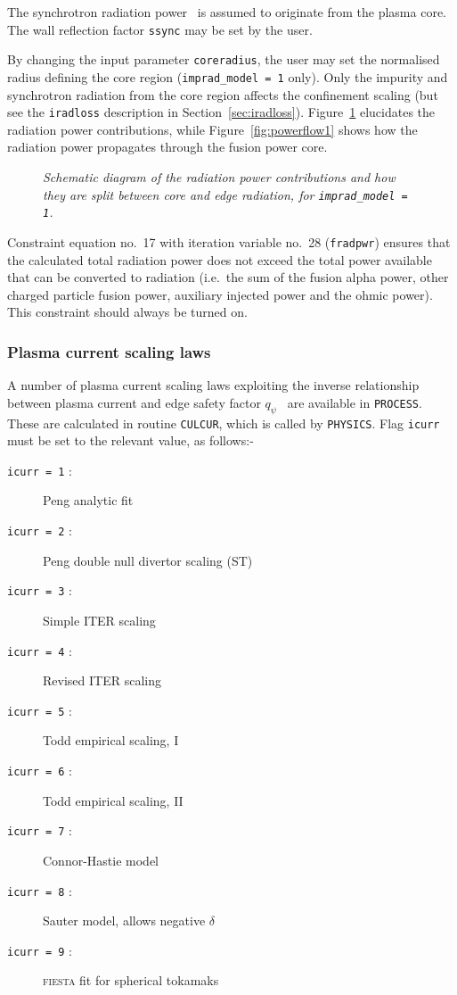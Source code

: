 \documentclass[11pt,a4paper]{report}
\newcommand{\process}{\mbox{\texttt{PROCESS}}}
\begin{document}
The synchrotron radiation power~\cite{albajar, fidone} is assumed to originate
from the plasma core. The wall reflection factor \texttt{ssync} may be set by
the user.

By changing the input parameter \texttt{coreradius}, the user may set the
normalised radius defining the core region (\texttt{imprad\_model = 1}
only). Only the impurity and synchrotron radiation from the core region
affects the confinement scaling (but see the \texttt{iradloss} description in
Section~\ref{sec:iradloss}). Figure~\ref{fig:radiation} elucidates the
radiation power contributions, while Figure~\ref{fig:powerflow1} shows how the radiation power propagates through the fusion power core.

\begin{figure}[tbph]
\caption[Radiation power contributions] {\label{fig:radiation}
  \textit{Schematic diagram of the radiation power contributions and how they
    are split between core and edge radiation, for \texttt{imprad\_model = 1}.} }
\end{figure}

Constraint equation no.~17 with iteration variable no.~28 (\texttt{fradpwr})
ensures that the calculated total radiation power does not exceed the total
power available that can be converted to radiation (i.e.\ the sum of the fusion
alpha power, other charged particle fusion power, auxiliary injected power and
the ohmic power). This constraint should always be turned on.

\subsubsection{Plasma current scaling laws}
\label{sec:current_scaling}

A number of plasma current scaling laws exploiting the inverse relationship
between plasma current and edge safety factor $q_{\psi}$~\cite{172} are
available in \process. These are calculated in routine \texttt{CULCUR}, which
is called by \texttt{PHYSICS}.  Flag \texttt{icurr} must be set to the
relevant value, as follows:-
\begin{description}
\item [\texttt{icurr = 1} :] Peng analytic fit
\item [\texttt{icurr = 2} :] Peng double null divertor scaling (ST)~\cite{storac}
\item [\texttt{icurr = 3} :] Simple ITER scaling
\item [\texttt{icurr = 4} :] Revised ITER scaling~\cite{Uckan88}
\item [\texttt{icurr = 5} :] Todd empirical scaling, I
\item [\texttt{icurr = 6} :] Todd empirical scaling, II
\item [\texttt{icurr = 7} :] Connor-Hastie model
\item [\texttt{icurr = 8} :] Sauter model, allows negative $\delta$
\item [\texttt{icurr = 9} :] \textsc{fiesta} fit for spherical tokamaks
\end{description}
\end{document}
